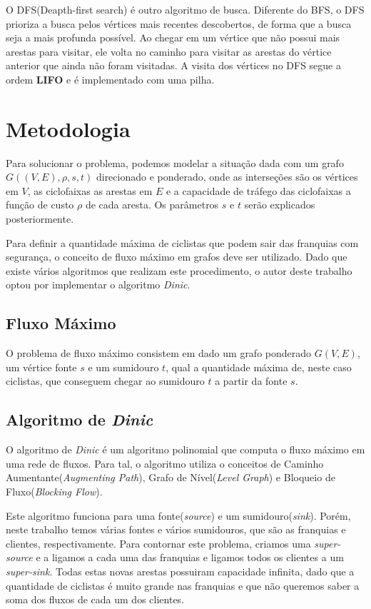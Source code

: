 \documentclass[
	12pt,
	a4paper,
	twoside,
	brazil
]{article}
\theoremstyle{definition}
\begin{document}
	O DFS(Deapth-first search) é outro algoritmo de busca. Diferente do BFS, o DFS prioriza a busca
	pelos vértices mais recentes descobertos, de forma que a busca seja a mais profunda possível. Ao chegar em um vértice que não possui mais arestas para visitar, ele volta no caminho para visitar as arestas do vértice anterior que ainda não foram visitadas. A visita dos vértices no DFS segue a ordem \textbf{LIFO} e é implementado com uma pilha.
	\section{Metodologia}
	
	Para solucionar o problema, podemos modelar a situação dada com um grafo $G((V,E), \rho, s, t)$ direcionado e ponderado, onde as interseções são os vértices em $V$, as ciclofaixas as arestas em $E$ e a capacidade de tráfego das ciclofaixas a função de custo $\rho$ de cada aresta. Os parâmetros $s$ e $t$ serão explicados posteriormente.
	
	Para definir a quantidade máxima de ciclistas que podem sair das franquias com segurança, o conceito de fluxo máximo em grafos deve ser utilizado. Dado que existe vários algoritmos que realizam este procedimento, o autor deste trabalho optou por implementar o algoritmo \textit{Dinic}.
	
	\subsection{Fluxo Máximo}
	
	O problema de fluxo máximo consistem em dado um grafo ponderado $G(V,E)$, um vértice fonte $s$ e um sumidouro $t$, qual a quantidade máxima de, neste caso ciclistas, que conseguem chegar ao sumidouro $t$ a partir da fonte $s$.
	
	\subsection{Algoritmo de \textit{Dinic}}
	
	O algoritmo de \textit{Dinic} é um algoritmo polinomial que computa o fluxo máximo em uma rede de fluxos. Para tal, o algoritmo utiliza o conceitos de Caminho Aumentante(\textit{Augmenting Path}), Grafo de Nível(\textit{Level Graph}) e Bloqueio de Fluxo(\textit{Blocking Flow}).
	
	Este algoritmo funciona para uma fonte(\textit{source}) e um sumidouro(\textit{sink}). Porém, neste trabalho temos várias fontes e vários sumidouros, que são as franquias e clientes, respectivamente. Para contornar este problema, criamos uma \textit{super-source} e a ligamos a cada uma das franquias e ligamos todos os clientes a um \textit{super-sink}. Todas estas novas arestas possuiram capacidade infinita, dado que a quantidade de ciclistas é muito grande nas franquias e que não queremos saber a soma dos fluxos de cada um dos clientes.
	
\end{document}

